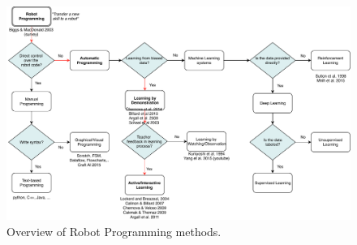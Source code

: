 
\begin{figure}[!h]
	\centering
	\includegraphics[width=\linewidth]{figures/RobotProgrammingOverview}
	\caption{Overview of Robot Programming methods.}
	\label{fig:RobotProgrammingOverview}
\end{figure} 
\newpage

